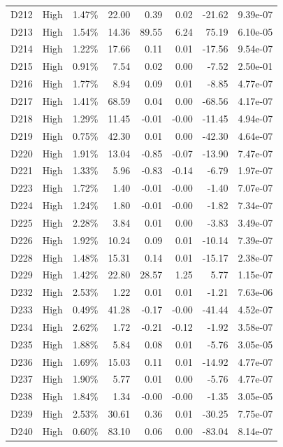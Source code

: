 \begin{tabular}{l l r r r r r r}
D212 & High & 1.47\% & 22.00 & 0.39 & 0.02 & -21.62 & 9.39e-07 \\
D213 & High & 1.54\% & 14.36 & 89.55 & 6.24 & 75.19 & 6.10e-05 \\
D214 & High & 1.22\% & 17.66 & 0.11 & 0.01 & -17.56 & 9.54e-07 \\
D215 & High & 0.91\% & 7.54 & 0.02 & 0.00 & -7.52 & 2.50e-01 \\
D216 & High & 1.77\% & 8.94 & 0.09 & 0.01 & -8.85 & 4.77e-07 \\
D217 & High & 1.41\% & 68.59 & 0.04 & 0.00 & -68.56 & 4.17e-07 \\
D218 & High & 1.29\% & 11.45 & -0.01 & -0.00 & -11.45 & 4.94e-07 \\
D219 & High & 0.75\% & 42.30 & 0.01 & 0.00 & -42.30 & 4.64e-07 \\
D220 & High & 1.91\% & 13.04 & -0.85 & -0.07 & -13.90 & 7.47e-07 \\
D221 & High & 1.33\% & 5.96 & -0.83 & -0.14 & -6.79 & 1.97e-07 \\
D223 & High & 1.72\% & 1.40 & -0.01 & -0.00 & -1.40 & 7.07e-07 \\
D224 & High & 1.24\% & 1.80 & -0.01 & -0.00 & -1.82 & 7.34e-07 \\
D225 & High & 2.28\% & 3.84 & 0.01 & 0.00 & -3.83 & 3.49e-07 \\
D226 & High & 1.92\% & 10.24 & 0.09 & 0.01 & -10.14 & 7.39e-07 \\
D228 & High & 1.48\% & 15.31 & 0.14 & 0.01 & -15.17 & 2.38e-07 \\
D229 & High & 1.42\% & 22.80 & 28.57 & 1.25 & 5.77 & 1.15e-07 \\
D232 & High & 2.53\% & 1.22 & 0.01 & 0.01 & -1.21 & 7.63e-06 \\
D233 & High & 0.49\% & 41.28 & -0.17 & -0.00 & -41.44 & 4.52e-07 \\
D234 & High & 2.62\% & 1.72 & -0.21 & -0.12 & -1.92 & 3.58e-07 \\
D235 & High & 1.88\% & 5.84 & 0.08 & 0.01 & -5.76 & 3.05e-05 \\
D236 & High & 1.69\% & 15.03 & 0.11 & 0.01 & -14.92 & 4.77e-07 \\
D237 & High & 1.90\% & 5.77 & 0.01 & 0.00 & -5.76 & 4.77e-07 \\
D238 & High & 1.84\% & 1.34 & -0.00 & -0.00 & -1.35 & 3.05e-05 \\
D239 & High & 2.53\% & 30.61 & 0.36 & 0.01 & -30.25 & 7.75e-07 \\
D240 & High & 0.60\% & 83.10 & 0.06 & 0.00 & -83.04 & 8.14e-07 \\

\end{tabular}
